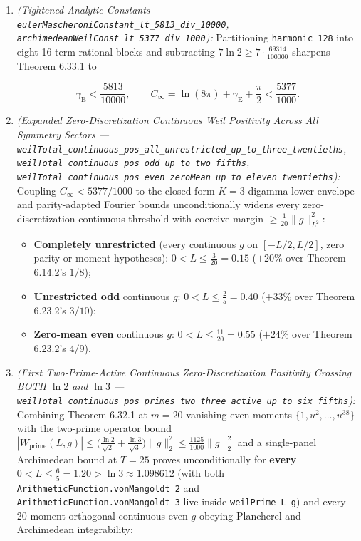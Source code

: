 \documentclass[
  11pt,
]{article}
\providecommand{\tightlist}{%
  \setlength{\itemsep}{0pt}\setlength{\parskip}{0pt}}
\begin{document}
\begin{enumerate}
\def\labelenumi{\arabic{enumi}.}
\item
  \emph{(Tightened Analytic Constants ---
  \texttt{eulerMascheroniConstant\_lt\_5813\_div\_10000},
  \texttt{archimedeanWeilConst\_lt\_5377\_div\_1000}):} Partitioning
  \texttt{harmonic\ 128} into eight 16-term rational blocks and
  subtracting \(7\ln 2 \ge 7 \cdot \frac{69314}{100000}\) sharpens
  Theorem 6.33.1 to

  \[\gamma_{\text{E}} < \frac{5813}{10000}, \qquad C_\infty = \ln(8\pi) + \gamma_{\text{E}} + \frac{\pi}{2} < \frac{5377}{1000}.\]
\item
  \emph{(Expanded Zero-Discretization Continuous Weil Positivity Across
  All Symmetry Sectors ---
  \texttt{weilTotal\_continuous\_pos\_all\_unrestricted\_up\_to\_three\_twentieths},
  \texttt{weilTotal\_continuous\_pos\_odd\_up\_to\_two\_fifths},
  \texttt{weilTotal\_continuous\_pos\_even\_zeroMean\_up\_to\_eleven\_twentieths}):}
  Coupling \(C_\infty < 5377/1000\) to the closed-form \(K = 3\) digamma
  lower envelope and parity-adapted Fourier bounds unconditionally
  widens every zero-discretization continuous threshold with coercive
  margin \(\ge \frac{1}{20}\|g\|_{L^2}^2\):

  \begin{itemize}
  \tightlist
  \item
    \textbf{Completely unrestricted} (every continuous \(g\) on
    \([-L/2, L/2]\), zero parity or moment hypotheses):
    \(0 < L \le \frac{3}{20} = 0.15\) (\(+20\%\) over Theorem 6.14.2's
    \(1/8\));
  \item
    \textbf{Unrestricted odd} continuous \(g\):
    \(0 < L \le \frac{2}{5} = 0.40\) (\(+33\%\) over Theorem 6.23.2's
    \(3/10\));
  \item
    \textbf{Zero-mean even} continuous \(g\):
    \(0 < L \le \frac{11}{20} = 0.55\) (\(+24\%\) over Theorem 6.23.2's
    \(4/9\)).
  \end{itemize}
\item
  \emph{(First Two-Prime-Active Continuous Zero-Discretization
  Positivity Crossing BOTH \(\ln 2\) and \(\ln 3\) ---
  \texttt{weilTotal\_continuous\_pos\_primes\_two\_three\_active\_up\_to\_six\_fifths}):}
  Combining Theorem 6.32.1 at \(m = 20\) vanishing even moments
  \(\{1, u^2, \dots, u^{38}\}\) with the two-prime operator bound
  \(|W_{\text{prime}}(L, g)| \le \big(\frac{\ln 2}{\sqrt{2}} + \frac{\ln 3}{\sqrt{3}}\big)\|g\|_2^2 \le \frac{1125}{1000}\|g\|_2^2\)
  and a single-panel Archimedean bound at \(T = 25\) proves
  unconditionally for \textbf{every}
  \(0 < L \le \frac{6}{5} = 1.20 > \ln 3 \approx 1.098612\) (with both
  \texttt{ArithmeticFunction.vonMangoldt\ 2} and
  \texttt{ArithmeticFunction.vonMangoldt\ 3} live inside
  \texttt{weilPrime\ L\ g}) and every 20-moment-orthogonal continuous
  even \(g\) obeying Plancherel and Archimedean integrability:


\end{enumerate}
\end{document}
